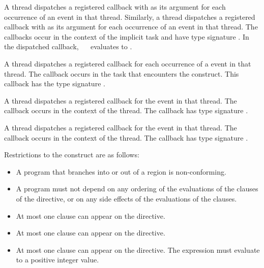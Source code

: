 A thread dispatches a registered  callback 
with  as its  argument for each occurrence 
of an  event in that thread. Similarly, a thread 
dispatches a registered  callback with 
 as its  argument for each occurrence 
of an  event in that thread. The callbacks occur in 
the context of the implicit task and have type signature 
. In the dispatched callback, 
\code{(}~\code{&}~ evaluates to .

A thread dispatches a registered 
callback for each occurrence of a  event in that
thread.  The callback occurs in the task that encounters the  
construct.  This callback has the type signature .

A thread dispatches a registered 
callback for the  event in that thread. The callback 
occurs in the context of the thread.  The callback has type signature
.

A thread dispatches a registered 
callback for the  event in that thread. The callback 
occurs in the context of the thread.  The callback has type signature
.

\restrictions
Restrictions to the  construct are as follows:

\begin{itemize}
\item A program that branches into or out of a  region is 
      non-conforming.
\item A program must not depend on any ordering of the evaluations of the clauses 
      of the  directive, or on any side effects of the evaluations 
      of the clauses.
\item At most one  clause can appear on the directive.
\item At most one  clause can appear on the directive.
\item At most one  clause can appear on the directive. 
      The  expression must evaluate to a positive integer value.

\end{itemize}

